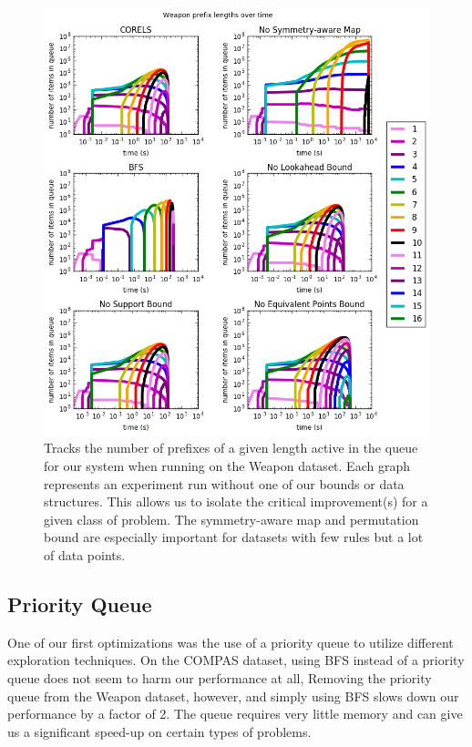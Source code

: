 \begin{figure}
\begin{center}
\includegraphics[width=1.1\textwidth]{figs/weapon_prefixes.png}
\end{center}
\caption{Tracks the number of prefixes of a given length active in the queue for our system when running on the Weapon dataset.
Each graph represents an experiment run without one of our bounds or data structures.
This allows us to isolate the critical improvement(s) for a given class of problem.
The symmetry-aware map and permutation bound are especially important for datasets with few rules but a lot of data points.
}
\label{fig:weapon-prefixes}
\end{figure}

\subsection{Priority Queue} \label{exp:priority}

One of our first optimizations was the use of a priority queue to utilize different exploration techniques. 
On the COMPAS dataset, using BFS instead of a priority queue does not seem to harm our performance at all, 
Removing the priority queue from the Weapon dataset, however, and simply using BFS slows down our performance by a factor of 2.
The queue requires very little memory and can give us a significant speed-up on certain types of problems.

